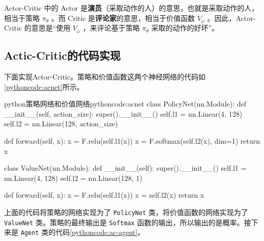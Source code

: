 \documentclass[lang=cn,newtx,10pt,scheme=chinese]{elegantbook}
\newcommand{\py}[1]{%
  \colorbox{gray!10}{\texttt{#1}}%
}
\begin{document}
\begin{marker}
Actor-Critic 中的 Actor 是\textbf{演员}（采取动作的人）的意思，也就是采取动作的人，相当于策略 $\pi_{\theta}$ 。而 Critic 是\textbf{评论家}的意思，相当于价值函数 $V_{\omega}$ 。因此，Actor-Critic 的意思是``使用 $V_{\omega}$ ，来评论基于策略 $\pi_{\theta}$ 采取的动作的好坏''。
\end{marker}

\subsection{Actic-Critic的代码实现}

下面实现Actor-Critic。策略和价值函数这两个神经网络的代码如\ref{pythoncode:acnet}所示。

\begin{codebox}{python}{策略网络和价值网络}{pythoncode:acnet}
class PolicyNet(nn.Module):
    def __init__(self, action_size):
        super().__init__()
        self.l1 = nn.Linear(4, 128)
        self.l2 = nn.Linear(128, action_size)

    def forward(self, x):
        x = F.relu(self.l1(x))
        x = F.softmax(self.l2(x), dim=1)
        return x

class ValueNet(nn.Module):
    def __init__(self):
        super().__init__()
        self.l1 = nn.Linear(4, 128)
        self.l2 = nn.Linear(128, 1)

    def forward(self, x):
        x = F.relu(self.l1(x))
        x = self.l2(x)
        return x
\end{codebox}

上面的代码将策略的网络实现为了 \py{PolicyNet} 类，将价值函数的网络实现为了 \py{ValueNet} 类。策略的最终输出是 \py{Softmax} 函数的输出，所以输出的是概率。接下来是 \py{Agent} 类的代码\ref{pythoncode:ac-agent}。
\end{document}
